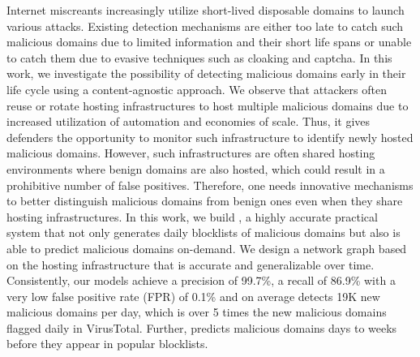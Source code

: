 Internet miscreants increasingly utilize short-lived disposable domains to launch various attacks. Existing detection mechanisms are either too late to catch such malicious domains due to limited information and their short life spans or unable to catch them due to evasive techniques such as cloaking and captcha. In this work, we investigate the possibility of detecting malicious domains early in their  life cycle using a content-agnostic approach.
We observe that attackers often reuse or rotate hosting infrastructures to host multiple malicious domains due to increased utilization of automation and economies of scale. 
Thus, it gives defenders the opportunity to monitor such infrastructure to identify newly hosted malicious domains. However, such infrastructures are often shared hosting environments where benign domains are also hosted, which could result in a prohibitive number of false positives. 
Therefore, one needs innovative mechanisms to better distinguish malicious domains from benign ones even when they share hosting infrastructures. In this work, we build \system, a highly accurate practical system that not only generates daily blocklists of malicious domains but also is able to predict malicious domains on-demand. We design a network graph based on the hosting infrastructure that is accurate and generalizable over time. Consistently, our models achieve a precision 
of 99.7\%, a recall of 86.9\% with a very low false positive rate (FPR) of 0.1\% and on average detects 19K new malicious domains per day, which is over 5 times the new malicious domains flagged daily in VirusTotal. Further, \system predicts malicious domains days to weeks before they appear in popular blocklists. 
